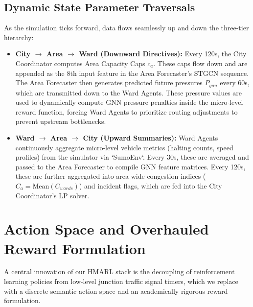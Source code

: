 \documentclass[conference]{IEEEtran}
\begin{document}
\subsection{Dynamic State Parameter Traversals}
As the simulation ticks forward, data flows seamlessly up and down the three-tier hierarchy:
\begin{itemize}
    \item \textbf{City $\rightarrow$ Area $\rightarrow$ Ward (Downward Directives):} Every 120s, the City Coordinator computes Area Capacity Caps $c_a$. These caps flow down and are appended as the 8th input feature in the Area Forecaster's STGCN sequence. The Area Forecaster then generates predicted future pressures $P_{gnn}$ every 60s, which are transmitted down to the Ward Agents. These pressure values are used to dynamically compute GNN pressure penalties inside the micro-level reward function, forcing Ward Agents to prioritize routing adjustments to prevent upstream bottlenecks.
    \item \textbf{Ward $\rightarrow$ Area $\rightarrow$ City (Upward Summaries):} Ward Agents continuously aggregate micro-level vehicle metrics (halting counts, speed profiles) from the simulator via `SumoEnv`. Every 30s, these are averaged and passed to the Area Forecaster to compile GNN feature matrices. Every 120s, these are further aggregated into area-wide congestion indices ($C_a = \text{Mean}(C_{wards})$) and incident flags, which are fed into the City Coordinator's LP solver.
\end{itemize}

\section{Action Space and Overhauled Reward Formulation}
A central innovation of our HMARL stack is the decoupling of reinforcement learning policies from low-level junction traffic signal timers, which we replace with a discrete semantic action space and an academically rigorous reward formulation.
\end{document}
